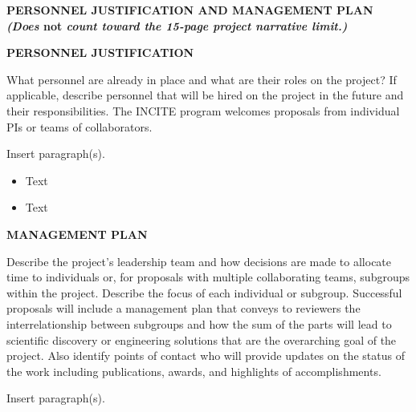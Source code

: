\documentclass[11pt,letterpaper,english]{article}
\begin{document}
\setlength{\parindent}{0in} %


\pagestyle{fancy}   \renewcommand{%
\headrulewidth}{0.0pt}

\begin{center}
\bf {PERSONNEL JUSTIFICATION AND MANAGEMENT PLAN} \\
{\bf  {\em (Does} not {\em count toward the 15-page project narrative limit.)}}
\end{center}

\vspace{-.25in}
\begin{flushleft}
{\noindent \bf  {PERSONNEL JUSTIFICATION}}

What personnel are already in place and what are their roles on the project? If applicable, describe personnel that will be hired on the project in the future and their responsibilities. The INCITE program welcomes proposals from individual PIs or teams of collaborators.

Insert paragraph(s). 
\vspace{-.15in}
\begin{itemize}
\item Text\\ 
\item Text\\
\end{itemize} 

{\noindent \bf  {MANAGEMENT PLAN}}

Describe the project's leadership team and how decisions are made to allocate time to individuals or, for proposals with multiple collaborating teams, subgroups within the project. Describe the focus of each individual or subgroup. Successful proposals will include a management plan that conveys to reviewers the interrelationship between subgroups and how the sum of the parts will lead to scientific discovery or engineering solutions that are the overarching goal of the project. Also identify points of contact who will provide updates on the status of the work including publications, awards, and highlights of accomplishments.

Insert paragraph(s).
\end{flushleft}
\end{document}
